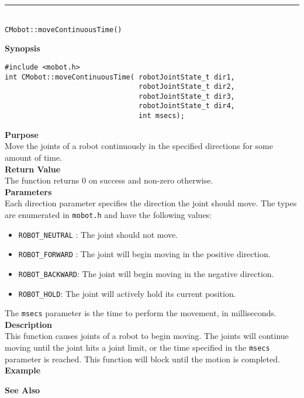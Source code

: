 \noindent
\vspace{5pt}
\rule{4.5in}{0.015in}\\
\noindent
{\LARGE \texttt{CMobot::moveContinuousTime()}}\\
{}

\noindent
{\bf Synopsis}
\vspace{-8pt}
\begin{verbatim}
#include <mobot.h>
int CMobot::moveContinuousTime( robotJointState_t dir1, 
                                robotJointState_t dir2, 
                                robotJointState_t dir3, 
                                robotJointState_t dir4, 
                                int msecs);
\end{verbatim}

\noindent
{\bf Purpose}\\
Move the joints of a robot continuously in the specified directions for some amount of time.\\

\noindent
{\bf Return Value}\\
The function returns 0 on success and non-zero otherwise.\\

\noindent
{\bf Parameters}\\
Each direction parameter specifies the direction the joint should move. The types
are enumerated in \texttt{mobot.h} and have the following values:
\begin{itemize}
\item \texttt{ROBOT\_NEUTRAL} : The joint should not move.
\item \texttt{ROBOT\_FORWARD} : The joint will begin moving in the positive direction.
\item \texttt{ROBOT\_BACKWARD}: The joint will begin moving in the negative direction.
\item \texttt{ROBOT\_HOLD}: The joint will actively hold its current position.
\end{itemize}
The \texttt{msecs} parameter is the time to perform the movement, in milliseconds.
\\

\noindent
{\bf Description}\\
This function causes joints of a robot to begin moving. The joints will continue moving
until the joint hits a joint limit, or the time specified in the \texttt{msecs} parameter
is reached. This function will block until the motion is completed.\\

\noindent
{\bf Example}\\
\noindent

\noindent
{\bf See Also}\\

